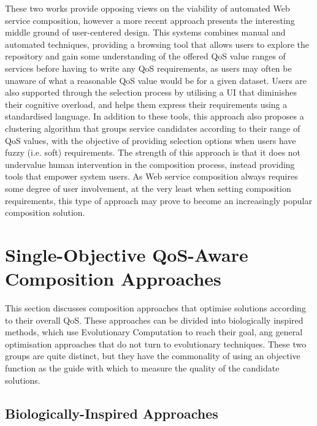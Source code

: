These two works provide opposing views on the viability of automated Web service composition, however a more recent approach \cite{mobedpour2013user} presents the interesting middle ground of user-centered design. This systems combines manual and automated techniques, providing a browsing tool that allows users to explore the repository and gain some understanding of the offered QoS value ranges of services before having to write any QoS requirements, as users may often be unaware of what a reasonable QoS value would be for a given dataset. Users are also supported through the selection process by utilising a UI that diminishes their cognitive overload, and helps them express their requirements using a standardised language. In addition to these tools, this approach also proposes a clustering algorithm that groups service candidates according to their range of QoS values, with the objective of providing selection options when users have fuzzy (i.e. soft) requirements. The strength of this approach is that it does not undervalue human intervention in the composition process, instead providing tools that empower system users. As Web service composition always requires some degree of user involvement, at the very least when setting composition requirements, this type of approach may prove to become an increasingly popular composition solution.

\section{Single-Objective QoS-Aware Composition Approaches}\label{ECandQoS}

This section discusses composition approaches that optimise solutions according to their overall QoS. These approaches can be divided into biologically inspired methods, which use Evolutionary Computation to reach their goal, ang general optimisation approaches that do not turn to evolutionary techniques. These two groups are quite distinct, but they have the commonality of using an objective function as the guide with which to measure the quality of the candidate solutions.

\subsection{Biologically-Inspired Approaches}

